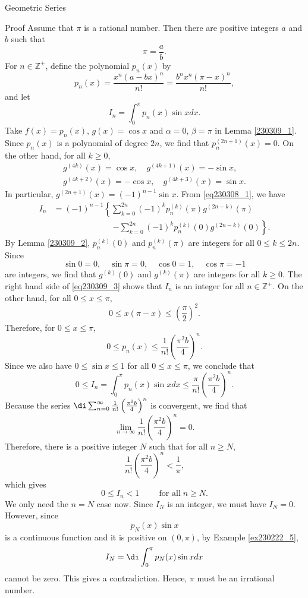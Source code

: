 \begin{example}[label=230305_16]{Geometric Series}
\begin{example}[label=230304_9]{}
\begin{example}{}
\begin{example}{}
\begin{myproof}{Proof}
Assume that $\pi$ is a rational number. Then there are positive integers $a$ and $b$ such that \[\pi =\frac{a}{b}.\] For   $n\in\mathbb{Z}^+$, define the polynomial $p_{n}(x)$ by
\[p_n(x)=\frac{x^n(a-bx)^n}{n!}=\frac{b^nx^n(\pi-x)^n}{n!},\]and let
\[I_n=\int_0^{\pi}p_n(x)\sin xdx.\]
Take $f(x)=p_n(x)$, $g(x)=\cos x$ and $\alpha=0$, $\beta=\pi$ in Lemma \ref{230309_1}. 
Since $p_n(x)$ is a polynomial of degree $2n$, we find that $p_n^{(2n+1)}(x)=0$. On the other hand, for all $k\geq 0$,
\begin{gather*}
g^{(4k)}(x)=\cos x, \quad g^{(4k+1)}(x)=-\sin x,\\g^{(4k+2)}(x)=-\cos x,\quad g^{(4k+3)}(x)=\sin x.\end{gather*}\bp
In particular,  $g^{(2n+1)}(x)=(-1)^{n-1}\sin x$. 
 From \eqref{eq230308_1}, we have
\begin{equation}\label{eq230309_3}\begin{split}
I_n &= (-1)^{n-1}\left\{\sum_{k=0}^{2n}(-1)^k p_n^{(k)}(\pi)g^{(2n-k)}(\pi)\right.\\&\hspace{3cm}\left.-\sum_{k=0}^{2n}(-1)^k p_n^{(k)}(0)g^{(2n-k)}(0)\right\}.\end{split}
\end{equation}By Lemma \ref{230309_2}, $p_n^{(k)}(0)$ and $p_n^{(k)}(\pi)$ are  integers for all $0\leq k\leq 2n$. Since
\[\sin 0=0,\quad \sin \pi =0, \quad \cos 0=1,\quad \cos \pi =-1\] are   integers, we find that $g^{(k)}(0)$ and $g^{(k)}(\pi)$ are  integers for all $k\geq 0$. The right hand side of \eqref{eq230309_3} shows  that $I_n$ is an integer for all $n\in\mathbb{Z}^+$. 
On the other hand, for all $0\leq x\leq \pi$,
\[0\leq x(\pi -x)\leq \left(\frac{\pi}{2}\right)^2.\]
Therefore, for $0\leq x\leq \pi$, 
\[0\leq p_n(x)\leq \frac{1}{n!}\left(\frac{\pi^2 b}{4}\right)^n.\]
Since we also have $0\leq\sin x\leq 1$ for all $0\leq x\leq \pi$, we conclude that
\[0\leq I_n=\int_0^{\pi}p_n(x)\sin x dx\leq  \frac{\pi}{n!}\left(\frac{\pi^2 b}{4}\right)^n.\] 
Because the series $\di\sum_{n=0}^{\infty} \frac{1}{n!}\left(\frac{\pi^2 b}{4}\right)^n$ is convergent, we find that 
\[\lim_{n\to\infty}  \frac{1}{n!}\left(\frac{\pi^2 b}{4}\right)^n=0.\]Therefore, there is a positive integer $N$ such that for all $n\geq N$,
\[  \frac{1}{n!}\left(\frac{\pi^2 b}{4}\right)^n<\frac{1}{\pi},\]
which gives
\[0\leq I_n<1\hspace{1cm}\text{for all}\;n\geq N.\]\bp
We only need the $n=N$ case now. Since $I_N$ is an integer, we must have $I_N=0$. However, since 
\[p_{N}(x)\sin  x\] is a  continuous function and it is positive on $(0,\pi)$, by Example \ref{ex230222_5}, \[I_N=\di\int_0^{\pi}p_N(x)\sin xdx\] cannot be zero. This gives a contradiction. Hence, $\pi$ must be an irrational number. 


\end{myproof}
\end{example}
\end{example}
\end{example}
\end{example}
